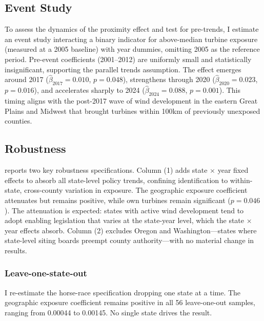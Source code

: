 \documentclass[12pt]{article}
\begin{document}


\subsection{Event Study}

To assess the dynamics of the proximity effect and test for pre-trends, I estimate an event study interacting a binary indicator for above-median turbine exposure (measured at a 2005 baseline) with year dummies, omitting 2005 as the reference period. Pre-event coefficients (2001--2012) are uniformly small and statistically insignificant, supporting the parallel trends assumption. The effect emerges around 2017 ($\hat{\beta}_{2017} = 0.010$, $p = 0.048$), strengthens through 2020 ($\hat{\beta}_{2020} = 0.023$, $p = 0.016$), and accelerates sharply to 2024 ($\hat{\beta}_{2024} = 0.088$, $p = 0.001$). This timing aligns with the post-2017 wave of wind development in the eastern Great Plains and Midwest that brought turbines within 100km of previously unexposed counties.

\subsection{Robustness}

 reports two key robustness specifications. Column (1) adds state $\times$ year fixed effects to absorb all state-level policy trends, confining identification to within-state, cross-county variation in exposure. The geographic exposure coefficient attenuates but remains positive, while own turbines remain significant ($p = 0.046$). The attenuation is expected: states with active wind development tend to adopt enabling legislation that varies at the state-year level, which the state $\times$ year effects absorb. Column (2) excludes Oregon and Washington---states where state-level siting boards preempt county authority---with no material change in results.



\subsubsection*{Leave-one-state-out} I re-estimate the horse-race specification dropping one state at a time. The geographic exposure coefficient remains positive in all 56 leave-one-out samples, ranging from 0.00044 to 0.00145. No single state drives the result.
\end{document}
